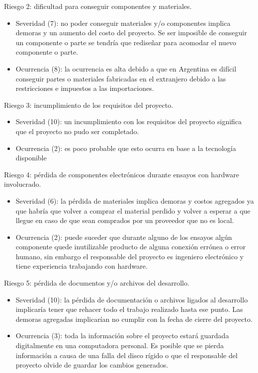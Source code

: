 \documentclass[11pt]{charter}
\begin{document}
Riesgo 2: dificultad para conseguir componentes y materiales.
\begin{itemize}
\item Severidad (7): no poder conseguir materiales y/o componentes implica demoras y un aumento del costo del proyecto. Se ser imposible de conseguir un componente o parte se tendría que rediseñar para acomodar el nuevo componente o parte. 
\item Ocurrencia (8): la ocurrencia es alta debido a que en Argentina es difícil conseguir partes o materiales fabricadas en el extranjero debido a las restricciones e impuestos a las importaciones.
\end{itemize}

Riesgo 3: incumplimiento de los requisitos del proyecto.
\begin{itemize}
\item Severidad (10): un incumplimiento con los requisitos del proyecto significa que el proyecto no pudo ser completado.
\item Ocurrencia (2): es poco probable que esto ocurra en base a la tecnología disponible
\end{itemize}

Riesgo 4: pérdida de componentes electrónicos durante ensayos con hardware involucrado.
\begin{itemize}
\item Severidad (6): la pérdida de materiales implica demoras y costos agregados ya que habría que volver a comprar el material perdido y volver a esperar a que llegue en caso de que sean comprados por un proveedor que no es local.
\item Ocurrencia (2): puede suceder que durante alguno de los ensayos algún componente quede inutilizable producto de alguna conexión errónea o error humano, sin embargo el responsable del proyecto es ingeniero electrónico y tiene experiencia trabajando con hardware.
\end{itemize}

Riesgo 5: pérdida de documentos y/o archivos del desarrollo.
\begin{itemize}
\item Severidad (10): la pérdida de documentación o archivos ligados al desarrollo implicaría tener que rehacer todo el trabajo realizado hasta ese punto. Las demoras agregadas implicarían no cumplir con la fecha de cierre del proyecto.
\item Ocurrencia (3): toda la información sobre el proyecto estará guardada digitalmente en una computadora personal. Es posible que se pierda información a causa de una falla del disco rígido o que el responsable del proyecto olvide de guardar los cambios generados.
\end{itemize}
\end{document}
